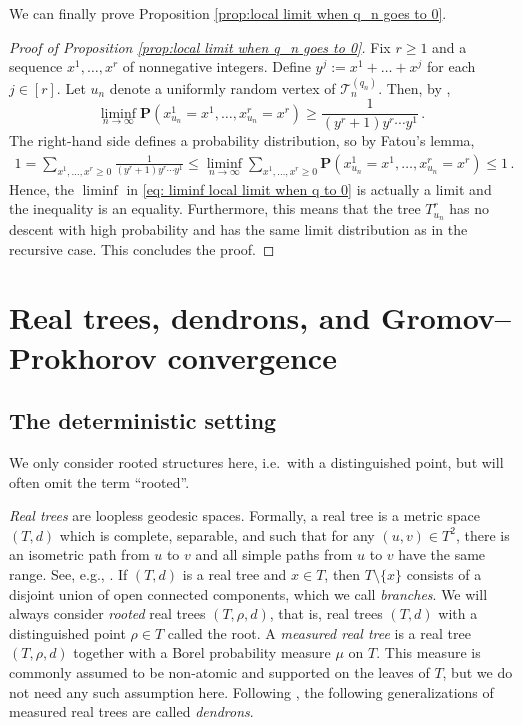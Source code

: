 \documentclass{article}
\theoremstyle{remark}
\newcommand{\cT}{\mathcal{T}}
\newcommand{\prob}[1]{\mathbf{P}{\left(#1\right)}}
\begin{document}
We can finally prove Proposition \ref{prop:local limit when q_n goes to 0}.

\begin{proof}[Proof of Proposition \ref{prop:local limit when q_n goes to 0}]
    Fix $r\ge1$ and a sequence $x^1, \dots, x^r$ of nonnegative integers.
    Define $y^j := x^1+\dots+x^j$ for each $j\in [r]$.
    Let $u_n$ denote a uniformly random vertex of $\cT_n^{(q_n)}$.
    Then, by ,
    \begin{equation}\label{eq: liminf local limit when q to 0}
    \liminf_{n\to\infty} \prob{ x_{u_n}^1 = x^1 , \dots , x_{u_n}^r = x^r } 
    \ge \frac{1}{(y^r+1) y^r \cdots y^1} \,.
    \end{equation}
    The right-hand side defines a probability distribution, so by Fatou's lemma,
    \begin{align*}
        1
        = \sum_{x^1,\dots,x^r\ge0} \frac{1}{(y^r+1) y^r \cdots y^1}
        \le \liminf_{n\to\infty} \sum_{x^1,\dots,x^r\ge0} \prob{ x_{u_n}^1 = x^1 , \dots , x_{u_n}^r = x^r } 
        \le 1 \,.
    \end{align*}
    Hence, the $\liminf$ in \eqref{eq: liminf local limit when q to 0} is actually a limit and the inequality is an equality.
    Furthermore, this means that the tree $T_{u_n}^r$ has no descent with high probability and has the same limit distribution as in the recursive case.
    This concludes the proof.
\end{proof}


\appendix

\section{Real trees, dendrons, and Gromov--Prokhorov convergence}
\label{sec: Gromov Prokhorov}

\subsection{The deterministic setting}

We only consider rooted structures here, i.e.~with a distinguished point, but will often omit the term ``rooted''.

\emph{Real trees} are loopless geodesic spaces.
Formally, a real tree is a metric space $(T,d)$ which is complete, separable, and such that for any $(u,v)\in T^2$, there is an isometric path from $u$ to $v$ and all simple paths from $u$ to $v$ have the same range.
See, e.g., \cite{LeGall_2006}.
If $(T,d)$ is a real tree and $x\in T$, then $T\setminus\{x\}$ consists of a disjoint union of open connected components, which we call \emph{branches}.
We will always consider \emph{rooted} real trees $(T,\rho,d)$, that is, real trees $(T,d)$ with a distinguished point $\rho\in T$ called the root.
A \emph{measured real tree} is a real tree $(T,\rho,d)$ together with a Borel probability measure $\mu$ on $T$.
This measure is commonly assumed to be non-atomic and supported on the leaves of $T$, but we do not need any such assumption here.
Following \cite{Janson21}, the following generalizations of measured real trees are called \emph{dendrons}.
\end{document}
